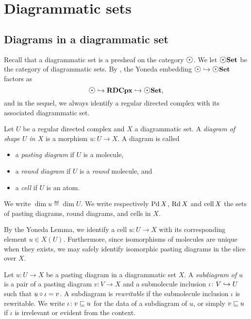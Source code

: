 \section{Diagrammatic sets}

\subsection{Diagrams in a diagrammatic set}

Recall that a diagrammatic set is a presheaf on the category \( \atom \).
We let \( \dgmSet \) be the category of diagrammatic sets.
By \cite[Lemma 2.5]{chanavat2024htpy}, the Yoneda embedding \( \atom \incl \dgmSet \) factors as
\begin{equation*}
    \atom \incl \rdcpx \incl \dgmSet,
\end{equation*} 
and in the sequel, we always identify a regular directed complex with its associated diagrammatic set.

\begin{dfn} 
    Let \( U \) be a regular directed complex and \( X \) a diagrammatic set.
    A \emph{diagram of shape \( U \) in \( X \)} is a morphism \( u \colon U \to X \).
    A diagram is called
    \begin{itemize}
        \item a \emph{pasting diagram} if \( U \) is a molecule,
        \item a \emph{round diagram} if \( U \) is a \emph{round} molecule, and
        \item a \emph{cell} if \( U \) is an atom.
    \end{itemize}
    We write \( \dim u \eqdef \dim U \).
    We write respectively \( \operatorname{Pd} X \), \( \operatorname{Rd} X \) and \( \operatorname{cell} X \) the sets of pasting diagrams, round diagrams, and cells in \( X \).
\end{dfn}

\begin{rmk}
    By the Yoneda Lemma, we identify a cell \( u \colon U \to X \) with its corresponding element \( u \in X(U) \).
    Furthermore, since isomorphisms of molecules are unique when they exists, we may safely identify isomorphic pasting diagrams in the slice over \( X \).
\end{rmk}

\begin{dfn} [Subdiagram]
    Let \( u \colon U \to X \) be a pasting diagram in a diagrammatic set \( X \).
    A \emph{subdiagram of \( u \)} is a pair of a pasting diagram \( v \colon V \to X \) and a submolecule inclusion \( \iota \colon V \hookrightarrow U \) such that \( u \circ \iota = v \).
    A subdiagram is \emph{rewritable} if the submolecule inclusion \( \iota \) is rewritable.
    We write \( \iota \colon v \sqsubseteq u \) for the data of a subdiagram of \( u \), or simply \( v \sqsubseteq u \) if \( \iota \) is irrelevant or evident from the context. 
\end{dfn}

